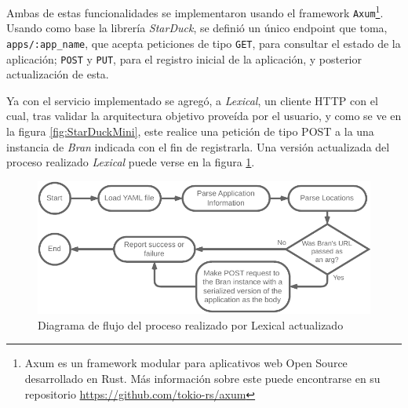Ambas de estas funcionalidades se implementaron usando el framework \texttt{Axum}\footnote{Axum es un framework modular para aplicativos web Open Source desarrollado en Rust. Más información sobre este puede encontrarse en su repositorio \url{https://github.com/tokio-rs/axum}}. Usando como base la librería \textit{StarDuck}, se definió un único endpoint que toma, \texttt{apps/:app\_name}, que acepta peticiones de tipo \texttt{GET}, para consultar el estado de la aplicación; \texttt{POST} y \texttt{PUT}, para el registro inicial de la aplicación, y posterior actualización de esta. 

Ya con el servicio implementado se agregó, a \textit{Lexical}, un cliente HTTP con el cual, tras validar la arquitectura objetivo proveída por el usuario, y como se ve en la figura \ref{fig:StarDuckMini}, este realice una petición de tipo POST a la una instancia de \textit{Bran} indicada con el fin de registrarla. Una versión actualizada del proceso realizado \textit{Lexical} puede verse en la figura \ref{fig:UpdatedLexicalFlow}.

\begin{figure}[ht]
    \centering
    \caption{Diagrama de flujo del proceso realizado por Lexical actualizado}
    \label{fig:UpdatedLexicalFlow}
    \includegraphics[width=0.9\linewidth]{images/UpdatedLexicalFlow.pdf}
\end{figure}